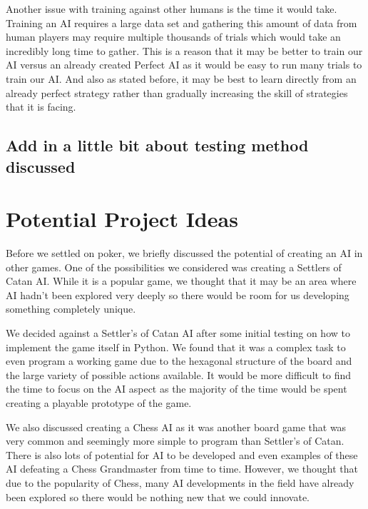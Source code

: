 \documentclass{article}
\begin{document}
\begin{multicols*}{2}
Another issue with training against other humans is the time it would take. Training an AI requires a large data set and gathering this amount of data from human players may require multiple thousands of trials which would take an incredibly long time to gather. This is a reason that it may be better to train our AI versus an already created Perfect AI as it would be easy to run many trials to train our AI. And also as stated before, it may be best to learn directly from an already perfect strategy rather than gradually increasing the skill of strategies that it is facing.

\subsection{Add in a little bit about testing method discussed}
\section{Potential Project Ideas}
Before we settled on poker, we briefly discussed the potential of creating an AI in other games. One of the possibilities we considered was creating a Settlers of Catan AI. While it is a popular game, we thought that it may be an area where AI hadn't been explored very deeply so there would be room for us developing something completely unique.
\newline

We decided against a Settler's of Catan AI after some initial testing on how to implement the game itself in Python. We found that it was a complex task to even program a working game due to the hexagonal structure of the board and the large variety of possible actions available. It would be more difficult to find the time to focus on the AI aspect as the majority of the time would be spent creating a playable prototype of the game.
\newline

We also discussed creating a Chess AI as it was another board game that was very common and seemingly more simple to program than Settler's of Catan. There is also lots of potential for AI to be developed and even examples of these AI defeating a Chess Grandmaster from time to time. However, we thought that due to the popularity of Chess, many AI developments in the field have already been explored so there would be nothing new that we could innovate.
\newline


\end{multicols*}
\end{document}
